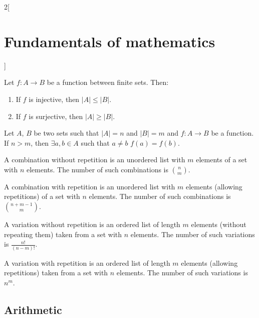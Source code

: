 \documentclass[../../../main.tex]{subfiles}
\begin{document}
\begin{multicols}{2}[\section{Fundamentals of mathematics}]
  \begin{corollary}
    Let $f:A\rightarrow B$ be a function between finite sets. Then:
    \begin{enumerate}
      \item If $f$ is injective, then $|A|\leq|B|$.
      \item If $f$ is surjective, then $|A|\geq|B|$.
    \end{enumerate}
  \end{corollary}
  \begin{theorem}
    Let $A$, $B$ be two sets such that $|A|=n$ and $|B|=m$ and $f:A\rightarrow B$ be a function. If $n>m$, then $\exists a,b\in A$ such that $a\ne b$ $f(a)=f(b)$.
  \end{theorem}
  \begin{prop}
    A combination without repetition is an unordered list with $m$ elements of a set with $n$ elements. The number of such combinations is $\binom{n}{m}$.
  \end{prop}
  \begin{prop}
    A combination with repetition is an unordered list with $m$ elements (allowing repetitions) of a set with $n$ elements. The number of such combinations is  $\binom{n+m-1}{m}$.
  \end{prop}
  \begin{prop}
    A variation without repetition is an ordered list of length $m$ elements (without repeating them) taken from a set with $n$ elements. The number of such variations is $\frac{n!}{(n-m)!}$.
  \end{prop}
  \begin{prop}
    A variation with repetition is an ordered list of length $m$ elements (allowing repetitions) taken from a set with $n$ elements. The number of such variations is $n^m$.
  \end{prop}
  \subsection{Arithmetic}

\end{multicols}
\end{document}
